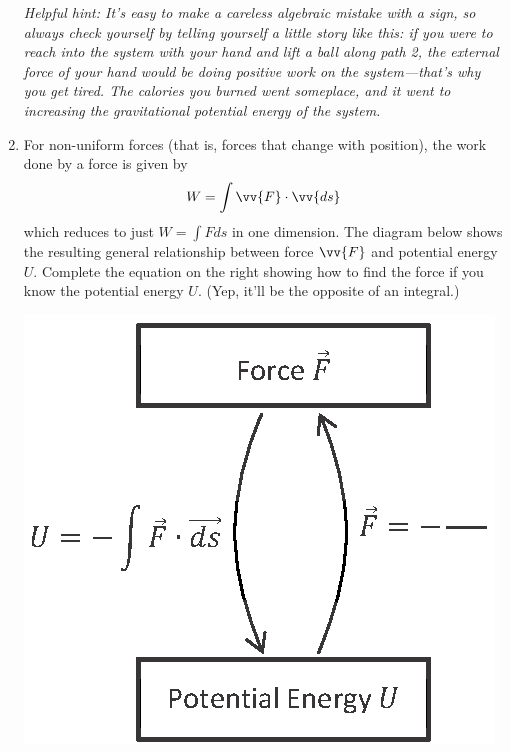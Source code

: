 \begin{enumerate}[wide, label=(\emph{\alph*})]
\textit{Helpful hint: It's easy to make a careless algebraic mistake with a sign, so always check yourself by telling yourself a little story like this: if you were to reach into the system with your hand and lift a ball along path 2, the external force of your hand would be doing \textit{positive} work on the system---that's why you get tired.  The calories you burned went someplace, and it went to \textit{increasing} the gravitational potential energy of the system. }

\pagebreak[3]

\item For non-uniform forces (that is, forces that change with position), the work done by a force is given by 
$$W=\int{\vv{F} \cdot \vv{ds}}$$
which reduces to just $W=\int{F ds}$ in one dimension.  The diagram below shows the resulting general relationship between force $\vv{F}$ and potential energy $U$.  Complete the equation on the right showing how to find the force if you know the potential energy $U$.  (Yep, it'll be the opposite of an integral.)
\begin{center}
\vspace{-0.1in}
\includegraphics{potential_intro/concept_map_figs/concept_map_F_and_U_blank_squish.eps}
\end{center}



\end{enumerate}
